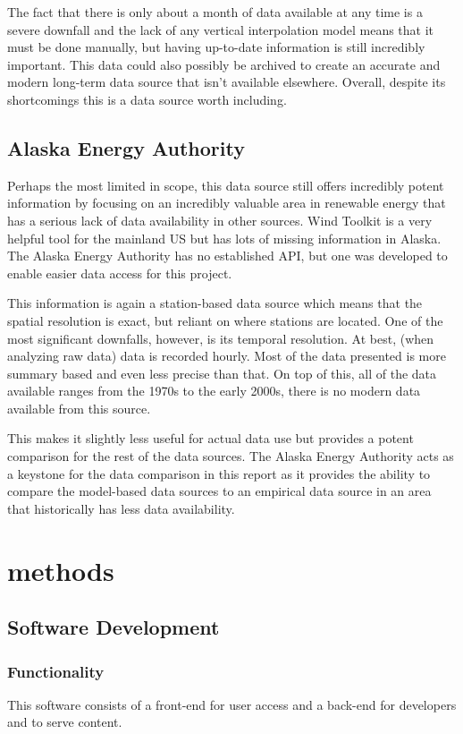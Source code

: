 \documentclass[12pt, oneside]{article}   	%
\begin{document}
The fact that there is only about a month of data available at any time is a
severe downfall and the lack of any vertical interpolation model means that it
must be done manually, but having up-to-date information is still incredibly
important. This data could also possibly be archived to create an accurate and
modern long-term data source that isn't available elsewhere. Overall, despite
its shortcomings this is a data source worth including.

\subsection{Alaska Energy Authority}
Perhaps the most limited in scope, this data source still offers incredibly
potent information by focusing on an incredibly valuable area in renewable
energy that has a serious lack of data availability in other sources. Wind
Toolkit is a very helpful tool for the mainland US but has lots of missing
information in Alaska. The Alaska Energy Authority has no established API, but
one was developed to enable easier data access for this project.

This information is again a station-based data source which means that the
spatial resolution is exact, but reliant on where stations are located. One of
the most significant downfalls, however, is its temporal resolution. At best,
(when analyzing raw data) data is recorded hourly. Most of the data presented is
more summary based and even less precise than that. On top of this, all of the
data available ranges from the 1970s to the early 2000s, there is no modern data
available from this source.

This makes it slightly less useful for actual data use but provides a potent
comparison for the rest of the data sources. The Alaska Energy Authority acts as
a keystone for the data comparison in this report as it provides the ability to
compare the model-based data sources to an empirical data source in an area that
historically has less data availability.

\section{methods}
\subsection{Software Development}
\subsubsection{Functionality}
This software consists of a front-end for user access and a back-end for
developers and to serve content.
\end{document}
